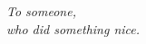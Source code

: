 {}

\vspace*{3cm}

\begingroup
\setlength{\parindent}{0cm}
\textit{To someone,\\
\hspace*{5mm}who did something nice.}
\endgroup

